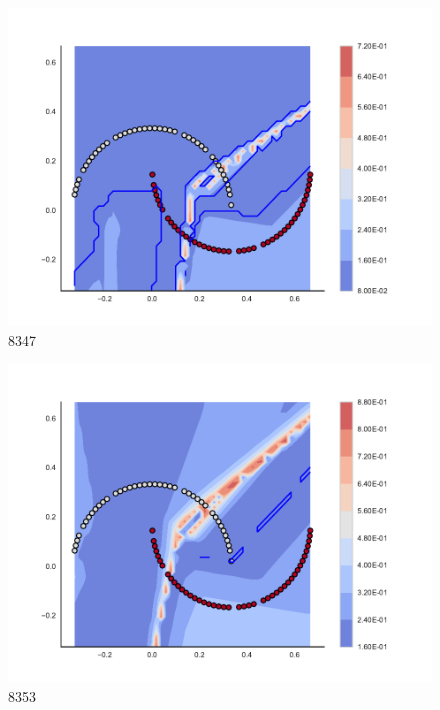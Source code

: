 \begin{subfigure}[b]{0.09\textwidth}
    \includegraphics[clip, trim=2.35cm 1.75cm 4.5cm 0cm,width=\textwidth]{img/convergence/8347.pdf}
    \caption{8347}
    \label{fig:convergence_8347}
\end{subfigure}
%
\begin{subfigure}[b]{0.09\textwidth}
    \includegraphics[clip, trim=2.35cm 1.75cm 4.5cm 0cm,width=\textwidth]{img/convergence/8353.pdf}
    \caption{8353}
    \label{fig:convergence_8353}
\end{subfigure}
%
